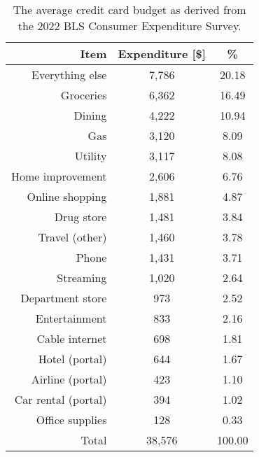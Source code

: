 \begin{table}[t!bh]
    \centering
    \begin{tabular}{ r c c } 
        \hline
        Item & Expenditure [\$] & \% \\ 
        \hline
        Everything else	& 7,786 & 20.18 \\
        Groceries & 6,362 & 16.49 \\
        Dining & 4,222 & 10.94 \\
        Gas	& 3,120	& 8.09 \\
        Utility	& 3,117	& 8.08 \\
        Home improvement & 2,606	& 6.76 \\
        Online shopping	& 1,881	& 4.87 \\
        Drug store	& 1,481 & 3.84 \\
        Travel (other) & 1,460 & 3.78 \\
        Phone & 1,431 & 3.71 \\
        Streaming & 1,020 & 2.64 \\
        Department store & 973 & 2.52 \\
        Entertainment & 833 & 2.16 \\
        Cable internet & 698 & 1.81 \\
        Hotel (portal) & 644 & 1.67 \\
        Airline (portal) & 423 & 1.10 \\
        Car rental (portal) & 394 & 1.02 \\
        Office supplies & 128 &	0.33 \\
        \hline
        \hline
        Total & 38,576	& 100.00 \\
    \end{tabular}
    \caption{The average credit card budget as derived from the 2022 BLS Consumer Expenditure Survey.}
    \label{tab:Budget}
\end{table}

